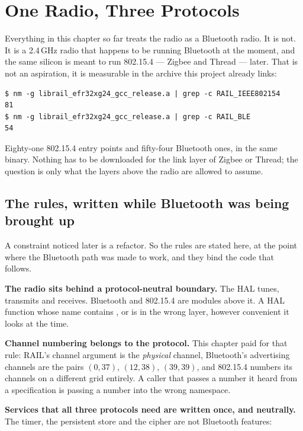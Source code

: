 \section{One Radio, Three Protocols}
\label{sec:ble-one-radio}

Everything in this chapter so far treats the radio as a Bluetooth radio. It is not. It is a 2.4\,GHz radio
that happens to be running Bluetooth at the moment, and the same silicon is meant to run 802.15.4 --- Zigbee
and Thread --- later. That is not an aspiration, it is measurable in the archive this project already
links:

\begin{verbatim}
$ nm -g librail_efr32xg24_gcc_release.a | grep -c RAIL_IEEE802154
81
$ nm -g librail_efr32xg24_gcc_release.a | grep -c RAIL_BLE
54
\end{verbatim}

Eighty-one 802.15.4 entry points and fifty-four Bluetooth ones, in the same binary. Nothing has to be
downloaded for the link layer of Zigbee or Thread; the question is only what the layers above the radio are
allowed to assume.

\subsection{The rules, written while Bluetooth was being brought up}

A constraint noticed later is a refactor. So the rules are stated here, at the point where the Bluetooth
path was made to work, and they bind the code that follows.

\textbf{The radio sits behind a protocol-neutral boundary.} The HAL tunes, transmits and receives. Bluetooth
and 802.15.4 are modules above it. A HAL function whose name contains ,
 or  is in the wrong layer, however convenient it looks
at the time.

\textbf{Channel numbering belongs to the protocol.} This chapter paid for that rule: RAIL's channel argument
is the \emph{physical} channel, Bluetooth's advertising channels are the pairs $(0,37)$, $(12,38)$,
$(39,39)$, and 802.15.4 numbers its channels on a different grid entirely. A caller that passes a number it
heard from a specification is passing a number into the wrong namespace.

\textbf{Services that all three protocols need are written once, and neutrally.} The timer, the persistent
store and the cipher are not Bluetooth features:


